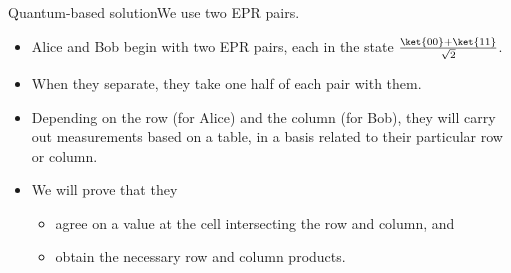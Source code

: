 {\begin{frame}{Quantum-based solution}{We use two EPR pairs.}

\begin{itemize}[<+->]
    \item Alice and Bob begin with two EPR pairs, each in the state $\frac{\ket{00}+\ket{11}}{\sqrt{2}}$.
    \item When they separate, they take one half of each pair with them.
    \item Depending on the row (for Alice) and the column (for Bob), they will carry out measurements based on a table, in a basis related to their particular row or column.
    \item We will prove that they
    \begin{itemize}
        \item agree on a value at the cell intersecting the row and column, and
        \item obtain the necessary row and column products.
    \end{itemize}
\end{itemize}
    
\end{frame}

}